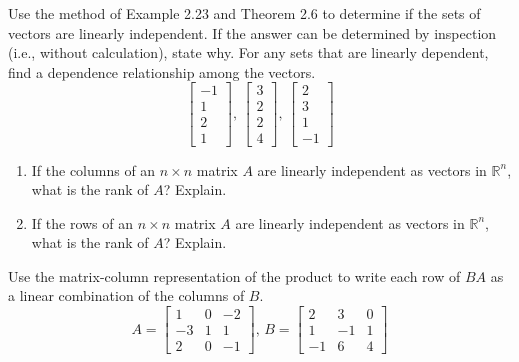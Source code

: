 \documentclass[12pt,letterpaper]{hmcpset}
\begin{document}
\begin{solution}
\vfill
\end{solution}
\newpage

\begin{problem}[2.2.28]

Use the method of Example 2.23 and Theorem 2.6 to determine if the sets of vectors are linearly independent. If the answer can be determined by inspection (i.e., without calculation), state why. For any sets that are linearly dependent, find a dependence relationship among the vectors.$$\begin{bmatrix}
	-1\\
	1\\
	2\\
	1
\end{bmatrix}\text{, }\begin{bmatrix}
	3\\
	2\\
	2\\
	4
\end{bmatrix}\text{, }\begin{bmatrix}
	2\\
	3\\
	1\\
	-1
\end{bmatrix}$$

\end{problem}

\begin{solution}
\vfill
\end{solution}
\newpage

\begin{problem}[2.3.42]

\begin{enumerate}
	\item
		If the columns of an $n \times n$ matrix $A$ are linearly independent as vectors in $\mathbb{R}^n$, what is the rank of $A$? Explain.
	\item
		If the rows of an $n \times n$ matrix $A$ are linearly independent as vectors in $\mathbb{R}^n$, what is the rank of $A$? Explain.
\end{enumerate}

\end{problem}

\begin{solution}
\vfill
\end{solution}
\newpage

\begin{problem}[3.1.26]

Use the matrix-column representation of the product to write each row of $BA$ as a linear combination of the columns of $B$.
	$$
	A=\begin{bmatrix}
		1 & 0 & -2\\
		-3 & 1 & 1\\
		2 & 0 & -1
	\end{bmatrix},\,B=\begin{bmatrix}
		2 & 3 & 0\\
		1 & -1 & 1\\
		-1 & 6 & 4
	\end{bmatrix}
	$$
\end{problem}
\end{document}
